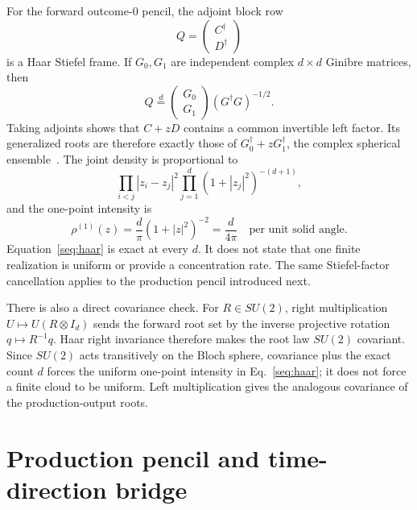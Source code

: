 \documentclass[aps,prl,onecolumn,10pt,notitlepage,superscriptaddress,nofootinbib]{revtex4-2}
\begin{document}
For the forward outcome-$0$ pencil, the adjoint block row
\begin{equation}
Q=\begin{pmatrix}C^\dagger\\D^\dagger\end{pmatrix}
\end{equation}
is a Haar Stiefel frame.  If $G_0,G_1$ are independent complex $d\times d$ Ginibre matrices, then
\begin{equation}
Q\overset{d}{=}\begin{pmatrix}G_0\\G_1\end{pmatrix}(G^\dagger G)^{-1/2}.
\end{equation}
Taking adjoints shows that $C+zD$ contains a common invertible left factor.  Its generalized roots are therefore exactly those of $G_0^\dagger+zG_1^\dagger$, the complex spherical ensemble~\cite{Krishnapur2009,AlishahiZamani2015}.  The joint density is proportional to
\begin{equation}
\prod_{i<j}|z_i-z_j|^2\prod_{j=1}^d(1+|z_j|^2)^{-(d+1)},
\end{equation}
and the one-point intensity is
\begin{equation}
\rho^{(1)}(z)=\frac{d}{\pi}(1+|z|^2)^{-2}=\frac{d}{4\pi}\quad\text{per unit solid angle}. \label{seq:haar}
\end{equation}
Equation~\eqref{seq:haar} is exact at every $d$.  It does not state that one finite realization is uniform or provide a concentration rate.  The same Stiefel-factor cancellation applies to the production pencil introduced next.

There is also a direct covariance check.  For $R\in SU(2)$, right multiplication $U\mapsto U(R\otimes I_d)$ sends the forward root set by the inverse projective rotation $q\mapsto R^{-1}q$.  Haar right invariance therefore makes the root law $SU(2)$ covariant.  Since $SU(2)$ acts transitively on the Bloch sphere, covariance plus the exact count $d$ forces the uniform one-point intensity in Eq.~\eqref{seq:haar}; it does not force a finite cloud to be uniform.  Left multiplication gives the analogous covariance of the production-output roots.

\section{Production pencil and time-direction bridge}
\end{document}
